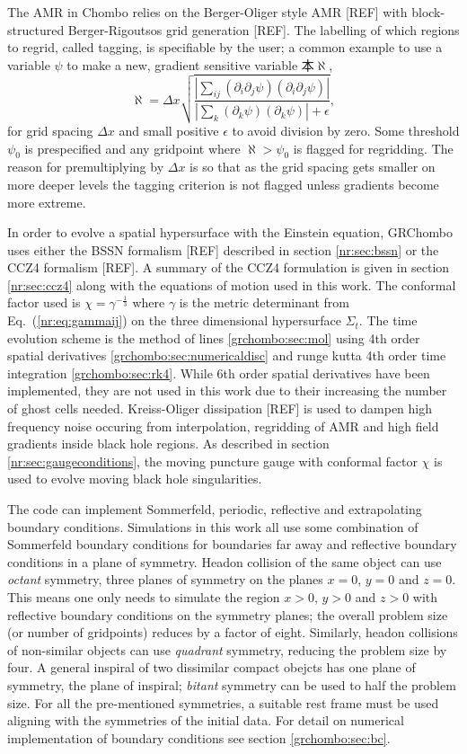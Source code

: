 The AMR in Chombo relies on the Berger-Oliger style AMR [REF] with block-structured Berger-Rigoutsos grid generation [REF]. The labelling of which regions to regrid, called tagging, is specifiable by the user; a common example to use a variable $\psi$ to make a new, gradient sensitive variable 本$\aleph$,
\begin{equation}
\aleph = \Delta x \sqrt{\frac{\left| \sum_{ij}(\partial_i\partial_j \psi )(\partial_i\partial_j \psi)\right|}{\left|\sum_{k} (\partial_k \psi )(\partial_k \psi)\right|+\epsilon}},
\end{equation}
for grid spacing $\Delta x$ and small positive $\epsilon$ to avoid division by zero. Some threshold $\psi_0$ is prespecified and any gridpoint where $\aleph > \psi_0$ is flagged for regridding. The reason for premultiplying by $\Delta x$ is so that as the grid spacing gets smaller on more deeper levels the tagging criterion is not flagged unless gradients become more extreme.

In order to evolve a spatial hypersurface with the Einstein equation, GRChombo uses either the BSSN formalism [REF] described in section \ref{nr:sec:bssn} or the CCZ4 formalism [REF]. A summary of the CCZ4 formulation is given in section \ref{nr:sec:ccz4} along with the equations of motion used in this work. The conformal factor used is $\chi = \gamma^{-\frac{1}{3}}$ where $\gamma$ is the metric determinant from Eq.~(\ref{nr:eq:gammaij}) on the three dimensional hypersurface $\Sigma_t$. The time evolution scheme is the method of lines \ref{grchombo:sec:mol} using 4th order spatial derivatives \ref{grchombo:sec:numericaldisc} and runge kutta 4th order time integration \ref{grchombo:sec:rk4}. While 6th order spatial derivatives have been implemented, they are not used in this work due to their increasing the number of ghost cells needed. Kreiss-Oliger dissipation [REF] is used to dampen high frequency noise occuring from interpolation, regridding of AMR and high field gradients inside black hole regions. As described in section \ref{nr:sec:gaugeconditions}, the moving puncture gauge with conformal factor $\chi$ is used to evolve moving black hole singularities.

The code can implement Sommerfeld, periodic, reflective and extrapolating boundary conditions. Simulations in this work all use some combination of Sommerfeld boundary conditions for boundaries far away and reflective boundary conditions in a plane of symmetry. Headon collision of the same object can use {\it octant} symmetry, three planes of symmetry on the planes $x=0$, $y=0$ and $z=0$. This means one only needs to simulate the region $x>0$, $y>0$ and $z>0$ with reflective boundary conditions on the symmetry planes; the overall problem size (or number of gridpoints) reduces by a factor of eight. Similarly, headon collisions of non-similar objects can use {\it quadrant} symmetry, reducing the problem size by four. A general inspiral of two dissimilar compact obejcts has one plane of symmetry, the plane of inspiral; {\it bitant} symmetry can be used to half the problem size. For all the pre-mentioned symmetries, a suitable rest frame must be used aligning with the symmetries of the initial data. For detail on numerical implementation of boundary conditions see section \ref{grchombo:sec:bc}.


